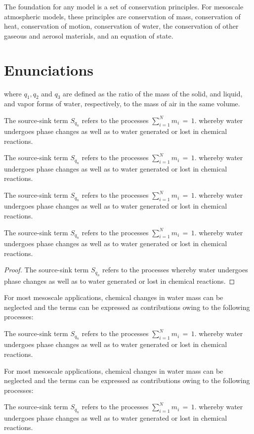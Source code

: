 \documentclass[onecolumn,authoryear]{els-mrw}
\begin{document}
The foundation for any model is a set of conservation principles. For mesoscale atmospheric models, these principles are conservation of mass, conservation of heat, conservation of motion, conservation of water, the conservation of other gaseous and aerosol materials, and an equation of state.

\section{Enunciations}
\label{chap1:App1}
where $q_1, q_2$ and $q_3$ are defined as the ratio of the mass of the
solid, \cite{bib8} and \cite{bib9} liquid, and vapor forms of water, respectively, to the mass of
air in the same volume.
\begin{theorem}
The source-sink term $S_{q_{n}}$ refers to the
processes $\sum_{i=1}^{N} m_i\,{=}\, 1$.  whereby water undergoes phase changes as well as to water
generated or lost in chemical reactions.
\end{theorem}
\begin{theorem}
The source-sink term $S_{q_{n}}$ refers to the
processes $\sum_{i=1}^{N} m_i\,{=}\, 1$.  whereby water undergoes phase changes as well as to water
generated or lost in chemical reactions.
\end{theorem}
\begin{theorem*}
The source-sink term $S_{q_{n}}$ refers to the
processes $\sum_{i=1}^{N} m_i\,{=}\, 1$.  whereby water undergoes phase changes as well as to water
generated or lost in chemical reactions.
\end{theorem*}
\begin{theorem*}
The source-sink term $S_{q_{n}}$ refers to the
processes $\sum_{i=1}^{N} m_i\,{=}\, 1$.  whereby water undergoes phase changes as well as to water
generated or lost in chemical reactions.
\end{theorem*}
\begin{proof}
The source-sink term $S_{q_{n}}$ refers to the \cite{bib10}
processes whereby water undergoes phase changes as well as to water
generated or lost in chemical reactions.
\end{proof}
For most mesoscale
applications, chemical changes in water mass can be neglected and the
terms can be expressed as contributions owing to the following
processes:
\begin{definition}
The source-sink term $S_{q_{n}}$ refers to the
processes $\sum_{i=1}^{N} m_i\,{=}\, 1$.  whereby water undergoes phase changes as well as to water
generated or lost in chemical reactions.
\end{definition}
For most mesoscale
applications, chemical changes in water mass can be neglected and the
terms can be expressed as contributions owing to the following
processes:
\begin{remark}
The source-sink term $S_{q_{n}}$ refers to the
processes $\sum_{i=1}^{N} m_i\,{=}\, 1$.  whereby water undergoes phase changes as well as to water
generated or lost in chemical reactions.
\end{remark}
\end{document}
